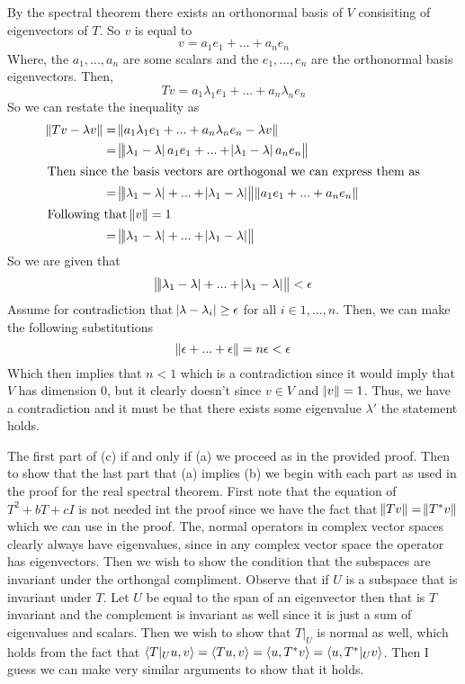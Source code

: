 \documentclass[10pt, twocolumn]{article}
\begin{document}
\begin{q}[12]
    By the spectral theorem there exists an orthonormal basis of $ V $ consisiting of eigenvectors of $ T $.
    So $ v $ is equal to 
    $$ v = a_1 e_1 + ... + a_n e_n $$ 
    Where, the $ a_1, ..., a_n $ are some scalars and the $ e_1, ..., e_n $ are the orthonormal basis eigenvectors.
    Then, 
    $$ Tv = a_1 \lambda_1 e_1 + ... + a_n \lambda_n e_n $$ 
    So we can restate the inequality as 
    \begin{align*}
    \norm{Tv - \lambda v}  &= \norm{a_1 \lambda_1 e_1 + ... + a_n \lambda_n e_n - \lambda v} \\
    &= \norm{ \abs{\lambda_1 - \lambda} a_1 e_1 + ... + \abs{\lambda_1 - \lambda} a_n e_n} \\
    \intertext{Then since the basis vectors are orthogonal we can express them as}
    &= \norm{\abs{\lambda_1 - \lambda} + ... + \abs{\lambda_1 - \lambda}}\norm{a_1 e_1 + ... + a_n e_n} \\
    \intertext{Following that $ \norm{v} = 1 $}
    &= \norm{\abs{\lambda_1 - \lambda} + ... + \abs{\lambda_1 - \lambda}} \\
    \end{align*}
    So we are given that 
    $$ \norm{\abs{\lambda_1 - \lambda} + ... + \abs{\lambda_1 - \lambda}} < \epsilon $$
    Assume for contradiction that $ \abs{\lambda - \lambda_i} \geq \epsilon $ for all $ i \in 1, ..., n $.
    Then, we can make the following substitutions
    $$ \norm{\epsilon + ... + \epsilon} = n \epsilon < \epsilon $$ 
    Which then implies that $ n < 1 $ which is a contradiction since it would imply that $ V $ has dimension 0, but it clearly doesn't since $ v \in V $ and $ \norm{v} = 1 $.
    Thus, we have a contradiction and it must be that there exists some eigenvalue $ \lambda' $ the statement holds.
\end{q}

\begin{q}[13]
    The first part of (c) if and only if (a) we proceed as in the provided proof. 
    Then to show that the last part that (a) implies (b) we begin with each part as used in the proof for the real spectral theorem.
    First note that the equation of $ T^2 + bT + cI $ is not needed int the proof since we have the fact that $ \norm{Tv} = \norm{T^* v} $ which we can use in the proof.
    The, normal operators in complex vector spaces clearly always have eigenvalues, since in any complex vector space the operator has eigenvectors.
    Then we wish to show the condition that the subspaces are invariant under the orthongal compliment.
    Observe that if $ U $ is a subspace that is invariant under $ T $. 
    Let $ U $ be equal to the span of an eigenvector then that is $ T $ invariant and the complement is invariant as well since it is just a sum of eigenvalues and scalars.
    Then we wish to show that $ T|_U $ is normal as well, which holds from the fact that 
    $ \langle T|_U u, v\rangle = \langle Tu, v\rangle = \langle u, T^* v\rangle = \langle u, T^*|_U v\rangle $.
    Then I guess we can make very similar arguments to show that it holds.
\end{q}
\end{document}
